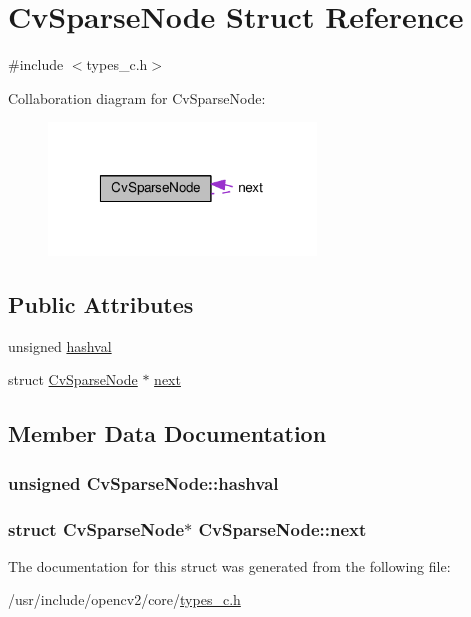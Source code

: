 \hypertarget{structCvSparseNode}{\section{Cv\-Sparse\-Node Struct Reference}
\label{structCvSparseNode}
}


{\ttfamily \#include $<$types\-\_\-c.\-h$>$}



Collaboration diagram for Cv\-Sparse\-Node\-:\nopagebreak
\begin{figure}[H]
\begin{center}
\leavevmode
\includegraphics[width=202pt]{structCvSparseNode__coll__graph}
\end{center}
\end{figure}
\subsection*{Public Attributes}
\begin{DoxyCompactItemize}
\item 
unsigned \hyperlink{structCvSparseNode_a8ebe6d566adbf646fbf08f4f5271c3e4}{hashval}
\item 
struct \hyperlink{structCvSparseNode}{Cv\-Sparse\-Node} $\ast$ \hyperlink{structCvSparseNode_a9031199ebada6f82597991e86967dc6a}{next}
\end{DoxyCompactItemize}


\subsection{Member Data Documentation}
\hypertarget{structCvSparseNode_a8ebe6d566adbf646fbf08f4f5271c3e4}{
\subsubsection[{hashval}]{\setlength{\rightskip}{0pt plus 5cm}unsigned Cv\-Sparse\-Node\-::hashval}}\label{structCvSparseNode_a8ebe6d566adbf646fbf08f4f5271c3e4}
\hypertarget{structCvSparseNode_a9031199ebada6f82597991e86967dc6a}{
\subsubsection[{next}]{\setlength{\rightskip}{0pt plus 5cm}struct {\bf Cv\-Sparse\-Node}$\ast$ Cv\-Sparse\-Node\-::next}}\label{structCvSparseNode_a9031199ebada6f82597991e86967dc6a}


The documentation for this struct was generated from the following file\-:\begin{DoxyCompactItemize}
\item 
/usr/include/opencv2/core/\hyperlink{core_2types__c_8h}{types\-\_\-c.\-h}\end{DoxyCompactItemize}
